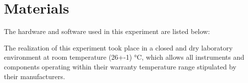 \section{Materials}

The hardware and software used in this experiment are listed below:

The realization of this experiment took place in a closed and dry laboratory environment at room temperature (26+-1)  °C, which allows all instruments and components operating within their warranty temperature range stipulated by their manufacturers.
